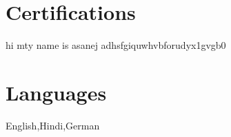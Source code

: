 \documentclass[a4paper,10pt]{article}
\begin{document}

\section{Certifications}
\begin{itemize}[leftmargin=0.15in,label=$\bullet$]
\small{

\item hi mty name is asanej adhsfgiquwhvbforudyx1gvgb0

}
\end{itemize}



\section{Languages}
\begin{itemize}[leftmargin=0.15in,label=$\bullet$]
\small{
\item English,Hindi,German
}
\end{itemize}
\end{document}
